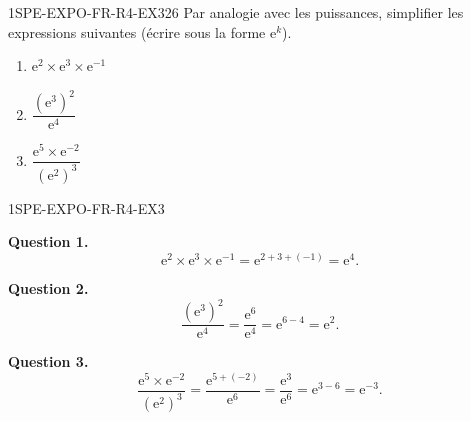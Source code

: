 
\begin{exercice}{1SPE-EXPO-FR-R4-EX3}{2}{6}
Par analogie avec les puissances, simplifier les expressions suivantes (écrire sous la forme $\mathrm{e}^k$).
\begin{enumerate}
  \item $\mathrm{e}^2 \times \mathrm{e}^3 \times \mathrm{e}^{-1}$
  \item $\dfrac{(\mathrm{e}^3)^2}{\mathrm{e}^4}$
  \item $\dfrac{\mathrm{e}^5 \times \mathrm{e}^{-2}}{(\mathrm{e}^2)^3}$
\end{enumerate}
\end{exercice}



\begin{corrige}{1SPE-EXPO-FR-R4-EX3}


\textbf{Question 1.}
\[
\mathrm{e}^2 \times \mathrm{e}^3 \times \mathrm{e}^{-1} = \mathrm{e}^{2+3+(-1)} = \mathrm{e}^{4}.
\]

\textbf{Question 2.}
\[
\frac{(\mathrm{e}^3)^2}{\mathrm{e}^4} = \frac{\mathrm{e}^{6}}{\mathrm{e}^{4}} = \mathrm{e}^{6-4} = \mathrm{e}^{2}.
\]

\textbf{Question 3.}
\[
\frac{\mathrm{e}^5 \times \mathrm{e}^{-2}}{(\mathrm{e}^2)^3} = \frac{\mathrm{e}^{5+(-2)}}{\mathrm{e}^{6}} = \frac{\mathrm{e}^{3}}{\mathrm{e}^{6}} = \mathrm{e}^{3-6} = \mathrm{e}^{-3}.
\]

\end{corrige}
